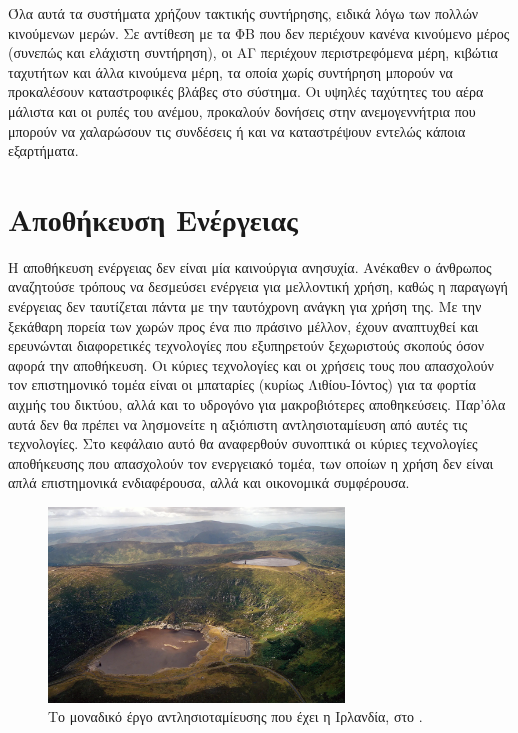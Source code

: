 \documentclass[12pt]{report}
\begin{document}
Όλα αυτά τα συστήματα χρήζουν τακτικής συντήρησης, ειδικά λόγω των πολλών κινούμενων μερών. Σε αντίθεση με τα ΦΒ που δεν περιέχουν κανένα κινούμενο μέρος (συνεπώς και ελάχιστη συντήρηση), οι ΑΓ περιέχουν περιστρεφόμενα μέρη, κιβώτια
ταχυτήτων και άλλα κινούμενα μέρη, τα οποία χωρίς συντήρηση μπορούν να προκαλέσουν καταστροφικές βλάβες στο σύστημα. Οι υψηλές ταχύτητες του αέρα μάλιστα και οι ρυπές του ανέμου, προκαλούν δονήσεις στην ανεμογεννήτρια που μπορούν να
χαλαρώσουν τις συνδέσεις ή και να καταστρέψουν εντελώς κάποια εξαρτήματα.

\chapter{Αποθήκευση Ενέργειας}
\label{chap:storage}
Η αποθήκευση ενέργειας δεν είναι μία καινούργια ανησυχία. Ανέκαθεν ο άνθρωπος αναζητούσε τρόπους να δεσμεύσει ενέργεια για μελλοντική χρήση, καθώς η παραγωγή ενέργειας δεν ταυτίζεται πάντα με την ταυτόχρονη ανάγκη για χρήση της. 
Με την ξεκάθαρη πορεία των χωρών προς ένα πιο πράσινο μέλλον, έχουν αναπτυχθεί και ερευνώνται διαφορετικές τεχνολογίες που εξυπηρετούν ξεχωριστούς σκοπούς όσον αφορά την αποθήκευση. 
Οι κύριες τεχνολογίες και οι χρήσεις τους που απασχολούν τον επιστημονικό τομέα
είναι οι μπαταρίες (κυρίως Λιθίου-Ιόντος) για τα φορτία αιχμής του δικτύου, αλλά και το υδρογόνο για μακροβιότερες αποθηκεύσεις. Παρ'όλα αυτά δεν θα πρέπει να λησμονείτε η αξιόπιστη αντλησιοταμίευση από αυτές τις τεχνολογίες. 
Στο κεφάλαιο αυτό θα αναφερθούν συνοπτικά οι κύριες τεχνολογίες αποθήκευσης που απασχολούν τον ενεργειακό τομέα, των οποίων η χρήση δεν είναι απλά επιστημονικά ενδιαφέρουσα, αλλά και οικονομικά συμφέρουσα.

\begin{figure}[h]
				\center
				\includegraphics[width=0.7\textwidth]{turlough-hill}
				\captionsetup{name=Εικόνα, width=0.8\textwidth}
				\caption{Το μοναδικό έργο αντλησιοταμίευσης που έχει η Ιρλανδία, στο {}.}
				\label{fig:turlough-hill}
\end{figure}
\end{document}
